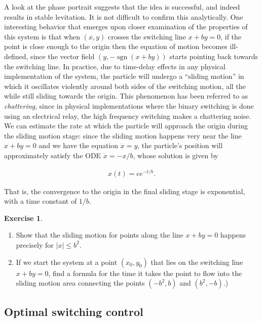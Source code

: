 \documentclass[11pt]{report}
\theoremstyle{plain}
\theoremstyle{definition}
\newtheorem{xexercise}[thm]{Exercise}
\begin{document}
\noindent A look at the phase portrait suggests that the idea is
successful, and indeed results in stable levitation.
It is not difficult to confirm this analytically. One
interesting behavior that emerges upon closer
examination of the properties of this system is that
when $(x,y)$ crosses the switching line $x+by=0$, if
the point is close enough to the origin then the
equation of motion becomes ill-defined, since the
vector field $(y,-\operatorname{sgn}(x+by))$ starts
pointing back towards the switching line. In practice,
due to time-delay effects in any physical
implementation of the system, the particle will
undergo a ``sliding motion'' in which it oscillates
violently around both sides of the switching motion,
all the while still sliding towards the origin. This
phenomenon has been referred to as \emph{chattering}, since
in physical implementations where the binary switching
is done using an electrical relay, the high frequency
switching makes a chattering noise. We can estimate
the rate at which the particle will approach the
origin during the sliding motion stage: since the
sliding motion happens very near the line $x+by=0$ and
we have the equation $\dot{x}=y$, the particle's
position will approximately satisfy the ODE
$\dot{x}=-x/b$, whose solution is given by

\begin{align*}
x(t) = c e^{-t/b}.
\end{align*}

\noindent That is, the convergence to the origin in the final
sliding stage is exponential, with a time constant of
$1/b$.

\begin{xexercise}

\begin{enumerate}[label=\arabic*.]
\item Show that the sliding motion for points along the line
$x+by=0$ happens precisely for $|x|\le b^2$.

\item If we start the system at a point $(x_0,y_0)$ that
lies on the switching line $x+by=0$, find a formula
for the time it takes the point to flow into the
sliding motion area connecting the points $(-b^2,b)$
and $(b^2,-b)$.)
\end{enumerate}

\end{xexercise}

\subsection{Optimal switching control}
\end{document}
